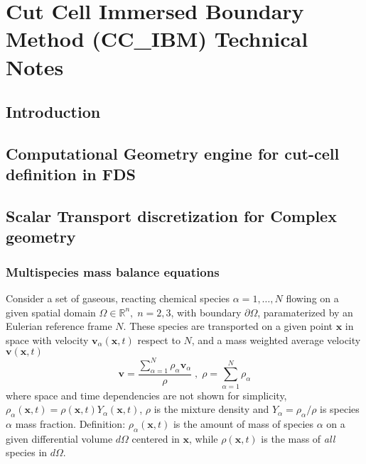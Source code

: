 \documentclass[12pt]{article}
\begin{document}
\clearpage

\section{Cut Cell Immersed Boundary Method (CC\_IBM) Technical Notes}


\subsection{Introduction}


\subsection{Computational Geometry engine for cut-cell definition in FDS}



\subsection{Scalar Transport discretization for Complex geometry}


\subsubsection{Multispecies mass balance equations}

Consider a set of gaseous, reacting  chemical species $\alpha=1,\dots,N$ flowing on a given spatial domain $\Omega \in \mathbb{R}^n, \; n=2,3$, with boundary $\partial \Omega$, paramaterized by an Eulerian reference frame $N$. These species are transported on a given point $\mathbf{x}$ in space with velocity $\mathbf{v}_\alpha(\mathbf{x},t)$ respect to $N$, and a mass weighted average velocity $\mathbf{v}(\mathbf{x},t)$
%
\begin{equation}
  \mathbf{v} = \frac{ \sum\limits_{\alpha=1}^{N} {\rho_\alpha \mathbf{v}_\alpha}}{\rho} \; , \; \rho =  \sum\limits_{\alpha=1}^{N} {\rho_\alpha} \label{eq:veldens}
\end{equation}
%
where space and time dependencies are not shown for simplicity, $\rho_\alpha(\mathbf{x},t) = \rho(\mathbf{x},t) Y_\alpha (\mathbf{x},t)$, $\rho$ is the mixture density and $Y_\alpha = \rho_\alpha / \rho$ is species $\alpha$ mass fraction. Definition: $\rho_\alpha(\mathbf{x},t)$ is the amount of mass of species $\alpha$ on a given differential volume $d\Omega$ centered in $\mathbf{x}$, while  $\rho(\mathbf{x},t)$ is the mass of \textit{all} species in $d\Omega$.
\end{document}
